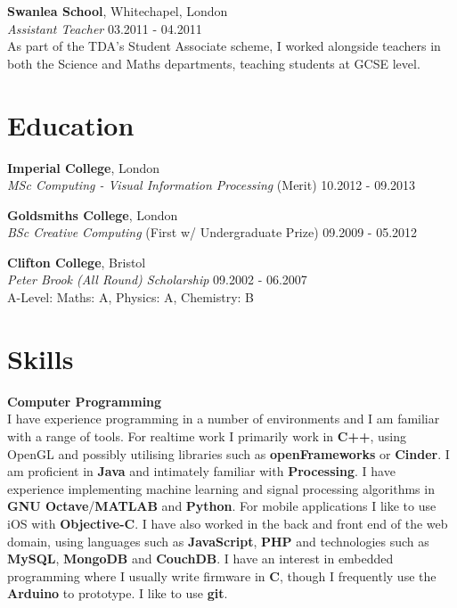\documentclass[margin,line,a4paper]{resume}
\begin{document}
\begin{resume}
\textbf{Swanlea School}, Whitechapel, London \vspace{1mm}\\
\textsl{Assistant Teacher} \hfill 03.2011 - 04.2011 \vspace{2mm} \\
As part of the TDA’s Student Associate scheme, I worked alongside
teachers in both the Science and Maths departments, teaching students at GCSE level.


\section{\mysidestyle Education}

\textbf{Imperial College}, London \vspace{0.5mm}\\
\textsl{MSc Computing - Visual Information Processing} (Merit) \hfill 10.2012 - 09.2013 \vspace{1mm}

\textbf{Goldsmiths College}, London \vspace{0.5mm}\\
\textsl{BSc Creative Computing} (First w/ Undergraduate Prize) \hfill 09.2009 - 05.2012 \vspace{1mm}

\textbf{Clifton College}, Bristol \vspace{0.5mm}\\
\textsl{Peter Brook (All Round) Scholarship} \hfill 09.2002 - 06.2007 \vspace{2mm} \\
A-Level: Maths: A, Physics: A, Chemistry: B

\section{\mysidestyle Skills}

\textbf{Computer Programming} \vspace{1mm} \\
I have experience programming in a number of environments and I am
familiar with a range of tools. For realtime work I primarily work in
\textbf{C++}, using OpenGL and possibly utilising
libraries such as \textbf{openFrameworks} or \textbf{Cinder}. I am
proficient in \textbf{Java} and intimately familiar with
\textbf{Processing}. I have experience implementing machine learning
and signal processing algorithms in \textbf{GNU
  Octave}/\textbf{MATLAB} and \textbf{Python}. For mobile applications
I like to use iOS with \textbf{Objective-C}. I have also worked in the
back and front end of the web domain, using languages such as
\textbf{JavaScript}, \textbf{PHP} and technologies such as
\textbf{MySQL}, \textbf{MongoDB} and \textbf{CouchDB}. I have an interest in embedded
programming where I usually write firmware in \textbf{C}, though I
frequently use the \textbf{Arduino} to prototype. I like to use
\textbf{git}.


\end{resume}
\end{document}
